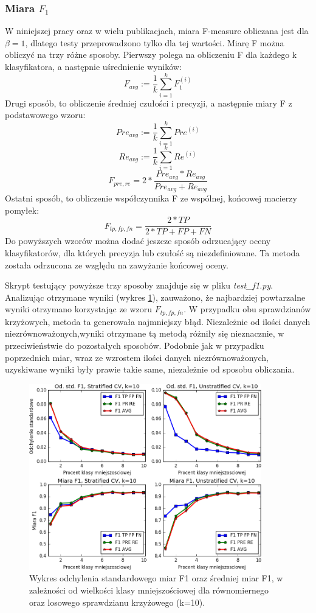 \subsubsection{Miara $F_1$}
W niniejszej pracy oraz w wielu publikacjach, miara F-measure obliczana jest dla $\beta=1$, dlatego testy przeprowadzono tylko dla tej wartości. Miarę F można obliczyć na trzy różne sposoby. Pierwszy polega na obliczeniu F dla każdego k klasyfikatora, a następnie uśrednienie wyników:
\[F_{avg} := \frac{1}{k} \sum_{i=1}^{k} F_1^{(i)}\]
Drugi sposób, to obliczenie średniej czułości i precyzji, a następnie miary F z podstawowego wzoru:
\[Pre_{avg} := \frac{1}{k} \sum_{i=1}^{k} Pre^{(i)}\]
\[Re_{avg} := \frac{1}{k} \sum_{i=1}^{k} Re^{(i)}\]
\[F_{pre, re} = 2 * \frac{Pre_{avg}*Re_{avg}}{Pre_{avg}+Re_{avg}} \]
Ostatni sposób, to obliczenie współczynnika F ze wspólnej, końcowej macierzy pomyłek:
\[F_{tp, fp, fn} = \frac{2*TP}{2*TP+FP+FN} \]
Do powyższych wzorów można dodać jeszcze sposób odrzucający oceny klasyfikatorów, dla których precyzja lub czułość są niezdefiniowane. Ta metoda została odrzucona ze względu na zawyżanie końcowej oceny. \par 
Skrypt testujący powyższe trzy sposoby znajduje się w pliku \textit{test\_f1.py}. Analizując otrzymane wyniki (wykres \ref{fig:wykresf1}), zauważono, że najbardziej powtarzalne wyniki otrzymano korzystając ze wzoru $F_{tp, fp, fn}$. W przypadku obu sprawdzianów krzyżowych, metoda ta generowała najmniejszy błąd. Niezależnie od ilości danych niezrównoważonych,wyniki otrzymane tą metodą różniły się nieznacznie, w przeciwieństwie do pozostałych sposobów. Podobnie jak w przypadku poprzednich miar, wraz ze wzrostem ilości danych niezrównoważonych, uzyskiwane wyniki były prawie takie same, niezależnie od sposobu obliczania.
\begin{figure}[H]
	\centering
	\includegraphics[width=0.9\textwidth]{./images/miara-F1.png}
	\caption[Odchylenie standardowe oraz średnia miar F1 dla sprawdzianu krzyżowego]{Wykres odchylenia standardowego miar F1 oraz średniej miar F1, w zależności od wielkości klasy mniejszościowej dla równomiernego oraz losowego sprawdzianu krzyżowego (k=10).}
	\label{fig:wykresf1}
\end{figure}
